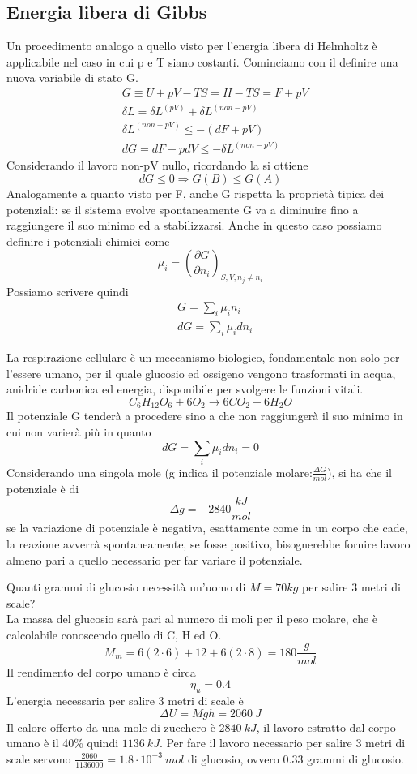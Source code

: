 \documentclass[
10pt, %
a4paper, %
oneside, %
headinclude,footinclude, %
BCOR5mm, %
]{scrartcl}
\begin{document}
\subsection{Energia libera di Gibbs}
Un procedimento analogo a quello visto per l'energia libera di Helmholtz è applicabile nel caso in cui p e T siano costanti. Cominciamo con il definire una nuova variabile di stato G. 
\begin{align*}
	&G \equiv U + pV -TS = H-TS  = F + pV\\
	&\delta L = \delta L^{(pV)} + \delta L^{(non-pV)}\\
	&\delta L^{(non-pV)} \leq -(dF + pV)\\
	&dG = dF + pdV \leq -\delta L ^{(non-pV)}
\end{align*}
Considerando il lavoro non-pV nullo, ricordando la si ottiene
\[dG\leq 0 \Rightarrow G(B)\leq G(A)\]
Analogamente a quanto visto per F, anche G rispetta la proprietà tipica dei potenziali: se il sistema evolve spontaneamente G va a diminuire fino a raggiungere il suo minimo ed a stabilizzarsi. Anche in questo caso possiamo definire i potenziali chimici come 
\[\mu_i = \left(\frac{\partial G}{\partial n_i}\right)_{S,V,n_j\neq n_i}\]
Possiamo scrivere quindi
\begin{align*}
	&G = \sum_i \mu_i n_i\\
	&dG = \sum_i \mu_i dn_i
\end{align*}
\begin{exercise}
	La respirazione cellulare è un meccanismo biologico, fondamentale non solo per l'essere umano, per il quale glucosio ed ossigeno vengono trasformati in acqua, anidride carbonica ed energia, disponibile per svolgere le funzioni vitali.
	\[C_6H_{12}O_6 + 6O_2\rightarrow 6CO_2 + 6H_2O\]
	Il potenziale G tenderà a procedere sino a che non raggiungerà il suo minimo in cui non varierà più in quanto 
	\[dG = \sum_i \mu_i dn_i = 0\]
	Considerando una singola mole (g indica il potenziale molare:$\frac{ \Delta G}{mol}$), si ha che il potenziale è di 
	\[\Delta g = -2840 \frac{kJ}{mol}\]
	se la variazione di potenziale è negativa, esattamente come in un corpo che cade, la reazione avverrà spontaneamente, se fosse positivo, bisognerebbe fornire lavoro almeno pari a quello necessario per far variare il potenziale.  
\end{exercise}
\begin{exercise}
	Quanti grammi di glucosio necessità un'uomo di \(M = 70 kg\) per salire 3 metri di scale?\\
	La massa del glucosio sarà pari al numero di moli per il peso molare, che è calcolabile conoscendo quello di C, H ed O. 
	\[M_m = 6(2\cdot 6)+12+6(2\cdot 8) = 180\frac{g}{mol}\]
	Il rendimento del corpo umano è circa
	\[\eta_{u} = 0.4\]
	L'energia necessaria per salire 3 metri di scale è
	\[\Delta U = M g h = 2060\ J\]
	Il calore offerto da una mole di zucchero è \(2840\ kJ\), il lavoro estratto dal corpo umano è il 40\% quindi \(1136\ kJ\). Per fare il lavoro necessario per salire 3 metri di scale servono \(\frac{2060}{1136000}= 1.8\cdot 10^{-3}\ mol\) di glucosio, ovvero 0.33 grammi di glucosio. 
\end{exercise}
\end{document}
